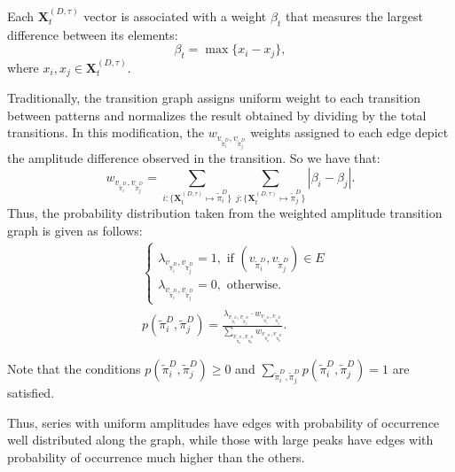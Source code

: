 \documentclass{isprs}
\begin{document}
Each $\mathbf{X}^{(D, \tau)}_t$ vector is associated with a weight $\beta_t$ that measures the largest difference between its elements:
\begin{equation}
\beta_t = \max\{x_i - x_j\},
\end{equation}
where $x_i, x_j \in \mathbf{X}^{(D, \tau)}_t$.

Traditionally, the transition graph assigns uniform weight to each transition between patterns and normalizes the result obtained by dividing by the total transitions.
In this modification, the $w_{v_{\widetilde\pi^D_i}, v_{\widetilde\pi^D_j}}$ weights assigned to each edge depict the amplitude difference observed in the transition.
So we have that:	
\begin{equation}
w_{v_{\widetilde \pi^D_i}, v_{\widetilde \pi^D_j}} =  \sum_{i : \{\mathbf{X}^{(D,\tau)}_t \mapsto \widetilde\pi^D_i\}} \sum_{j : \{\mathbf{X}^{(D,\tau)}_t \mapsto \widetilde\pi^D_j\}} |\beta_i - \beta_j| .
\end{equation}
Thus, the probability distribution taken from the weighted amplitude transition graph is given as follows:	
\begin{align}
&\left\{\begin{array}{l}
\lambda_{v_{\widetilde\pi^D_i}, v_{\widetilde\pi^D_j}} = 1, \text{ if } (v_{\widetilde\pi^D_i}, v_{\widetilde\pi^D_j}) \in {E} \\
\lambda_{v_{\widetilde\pi^D_i}, v_{\widetilde\pi^D_j}} = 0, \text{ otherwise}.
\end{array}\right. \\
%
&p(\widetilde\pi^D_i, \widetilde\pi^D_j) = \frac{\lambda_{v_{\widetilde\pi^D_i}, v_{\widetilde\pi^D_j}} \cdot w_{v_{\widetilde\pi^D_i}, v_{\widetilde\pi^D_j}}}{\sum_{v_{\widetilde\pi^D_a}, v_{\widetilde\pi^D_b}} w_{v_{\widetilde\pi^D_a}, v_{\widetilde\pi^D_b}}}.
\end{align}

Note that the conditions $p(\widetilde\pi^D_i, \widetilde\pi^D_j) \ge 0$ and $\sum_{\widetilde\pi^D_i, \widetilde\pi^D_j} p(\widetilde\pi^D_i, \widetilde\pi^D_j) = 1$ are satisfied.

Thus, series with uniform amplitudes have edges with probability of occurrence well distributed along the graph, while those with large peaks have edges with probability of occurrence much higher than the others.
\end{document}
